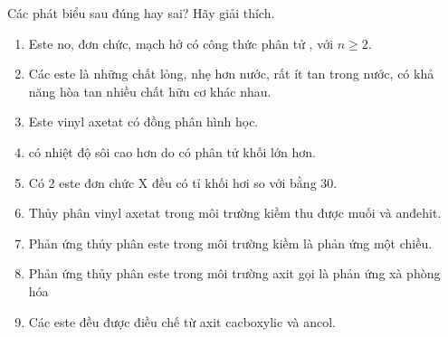 

\begin{bt}
Các phát biểu sau đúng hay sai? Hãy giải thích.

\begin{enumerate}[(1)]
	\item Este no, đơn chức, mạch hở có công thức phân tử , với $ n \geq 2 $.
	
	\dotfill
	\item Các este là những chất lỏng, nhẹ hơn nước, rất ít tan trong nước, có khả năng hòa tan nhiều chất hữu cơ khác nhau.
	
	\dotfill
	\item Este vinyl axetat có đồng phân hình học.
	
	\dotfill
	
	\item {} có nhiệt độ sôi cao hơn  do có phân tử khối lớn hơn.
	
	\dotfill
	
	\item Có 2 este đơn chức X đều có tỉ khối hơi so với  bằng $ 30 $. 
	
	\dotfill
	
	\item Thủy phân vinyl axetat trong môi trường kiềm thu được muối và anđehit.
	
	\dotfill
	
	\item Phản ứng thủy phân este trong môi trường kiềm là phản ứng một chiều.
	
	\dotfill
	
   \item Phản ứng thủy phân este trong môi trường axit gọi là phản ứng xà phòng hóa
   
   \dotfill
	
	 \item Các este đều được điều chế từ axit cacboxylic và ancol. 
	
	\dotfill
	
	
\end{enumerate}
\sodongkebt[\cauTH]
\end{bt}



